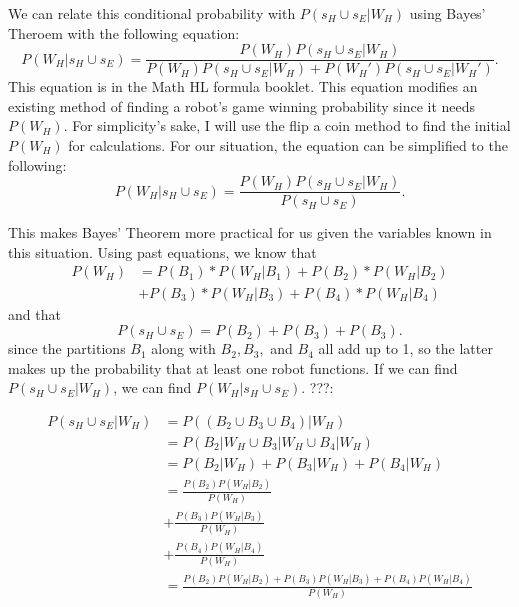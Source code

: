 \documentclass[11pt]{article}
\begin{document}
We can relate this conditional probability with \(P(s_H \cup s_E | W_H) \) using Bayes' Theroem with the following
equation:
\begin{equation*}
    P(W_H | s_H \cup s_E) = \frac{P(W_H) P(s_H \cup s_E | W_H)}{P(W_H) P(s_H \cup s_E | W_H) + P(W_H') P(s_H \cup s_E | W_H')}.
\end{equation*}
This equation is in the Math HL formula booklet. This equation modifies an existing method of finding
a robot's game winning probability since it needs \(P(W_H)\). For simplicity's sake, I will use the flip
a coin method to find the initial \(P(W_H)\) for calculations. For our situation, the equation can be 
simplified to the following:
\begin{equation*}
    P(W_H | s_H \cup s_E) = \frac{P(W_H) P(s_H \cup s_E | W_H)}{P(s_H \cup s_E)}.
\end{equation*}

This makes  Bayes' Theorem more practical for us given the variables known in this situation. Using past 
equations, we know that
\begin{align*}
    P(W_H) &=  P(B_{1}) * P(W_{H} | B_{1}) + P(B_{2}) * P(W_{H} | B_{2}) \\
    &+ P(B_{3}) * P(W_{H} | B_{3}) + P(B_{4}) * P(W_{H} | B_{4})
\end{align*}
and that
\begin{equation*}
    P(s_H \cup s_E) = P(B_2) + P(B_3) + P(B_3).
\end{equation*}
since the partitions \(B_1\) along with \(B_2, B_3,\) and \(B_4\) all add up to 1, so the latter makes up the probability that at least
one robot functions. If we can find \(P(s_H \cup s_E | W_H)\), we can find \(P(W_H | s_H \cup s_E)\). ???:

\begin{align*}
    P(s_H \cup s_E | W_H) &= P((B_2 \cup B_3 \cup B_4)| W_H)\\
    &= P(B_2 | W_H \cup B_3 | W_H \cup B_4 | W_H) \\
    &=P(B_2 | W_H) + P(B_3 | W_H) + P(B_4 | W_H)\\
    &= \frac{P(B_2) P(W_H | B_2)}{P(W_H)}\\
    &+ \frac{P(B_3)P(W_H | B_3)}{P(W_H)}\\
    &+ \frac{P(B_4)P(W_H | B_4)}{P(W_H)}\\
    &= \frac{P(B_2) P(W_H | B_2) + P(B_3)P(W_H | B_3) + P(B_4)P(W_H | B_4)}{P(W_H)}
\end{align*}
\end{document}
